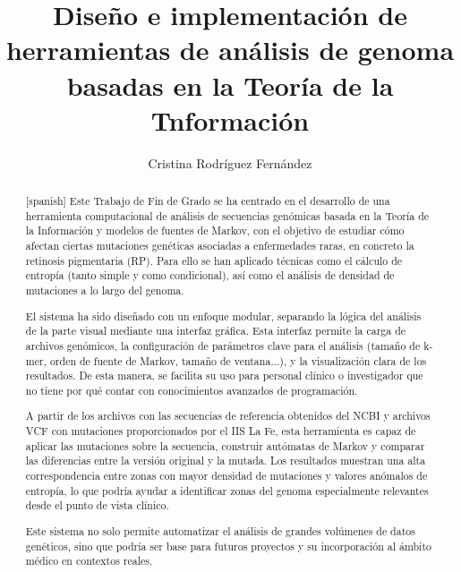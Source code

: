 \documentclass[11pt,spanish,listoffigures,listoftables]{tfgetsinf}
\title{Diseño e implementación de herramientas de análisis de genoma basadas en la Teoría de la Tnformación}
\author{Cristina Rodríguez Fernández}
\begin{document}

\begin{abstract}[spanish]
   Este Trabajo de Fin de Grado se ha centrado en el desarrollo de una herramienta computacional de análisis de secuencias genómicas basada en la Teoría de la Información y modelos de fuentes de Markov, con el objetivo de estudiar cómo afectan ciertas mutaciones genéticas asociadas a enfermedades raras, en concreto la retinosis pigmentaria (RP). Para ello se han aplicado técnicas como el cálculo de entropía (tanto simple y como condicional), así como el análisis de densidad de mutaciones a lo largo del genoma. 

   El sistema ha sido diseñado con un enfoque modular, separando la lógica del análisis de la parte visual mediante una interfaz gráfica. Esta interfaz permite la carga de archivos genómicos, la configuración de parámetros clave para el análisis (tamaño de k-mer, orden de fuente de Markov, tamaño de ventana...), y la visualización clara de los resultados. De esta manera, se facilita su uso para personal clínico o investigador que no tiene por qué contar con conocimientos avanzados de programación. 

   A partir de los archivos con las secuencias de referencia obtenidos del NCBI y archivos VCF con mutaciones proporcionados por el IIS La Fe, esta herramienta es capaz de aplicar las mutaciones sobre la secuencia, construir autómatas de Markov y comparar las diferencias entre la versión original y la mutada. Los resultados muestran una alta correspondencia entre zonas con mayor densidad de mutaciones y valores anómalos de entropía, lo que podría ayudar a identificar zonas del genoma especialmente relevantes desde el punto de vista clínico. 

   Este sistema no solo permite automatizar el análisis de grandes volúmenes de datos genéticos, sino que podría ser base para futuros proyectos y su incorporación al ámbito médico en contextos reales. 
   \\
   \\
\end{abstract}
\end{document}

